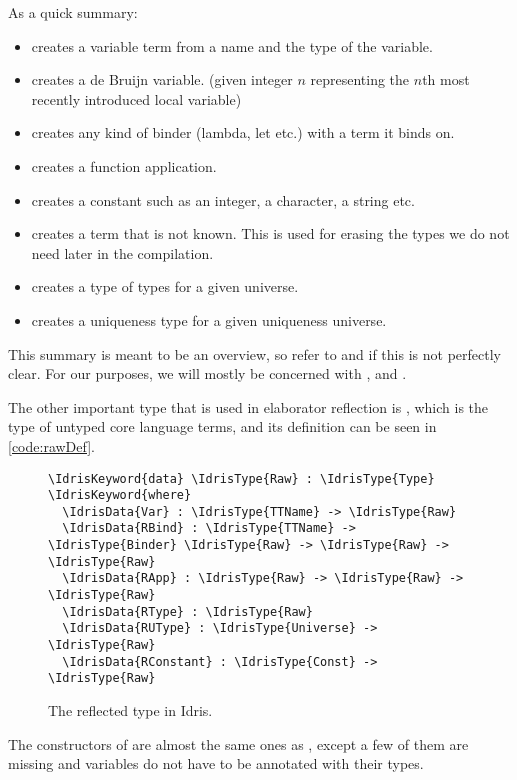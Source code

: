 As a quick summary:
\begin{itemize}
\item{} creates a variable term from a name and the type of the variable.
\item{} creates a de Bruijn variable.
(given integer $n$ representing the $n$th most recently introduced local variable)
\item{} creates any kind of binder (lambda, let etc.) with a term it binds on.
\item{} creates a function application.
\item{} creates a constant such as an integer, a character, a string etc.
\item{} creates a term that is not known. This is used for erasing the types we do not need later in the compilation.
\item{} creates a type of types for a given universe.
\item{} creates a uniqueness type for a given uniqueness universe.
\end{itemize}

This summary is meant to be an overview, so refer to \cite{idris} and
\cite{elabref} if this is not perfectly clear. For our purposes, we will mostly
be concerned with ,  and .

The other important type that is used in elaborator reflection is ,
which is the type of untyped core language terms, and its definition can be
seen in \autoref{code:rawDef}.

\begin{figure}[ht]
\caption{The reflected type \protect{} in Idris.}
\label{code:rawDef}
\begin{Verbatim}[framesep=2mm, label=\footnotesize{\normalfont{Idris}}, labelposition=topline]
\IdrisKeyword{data} \IdrisType{Raw} : \IdrisType{Type} \IdrisKeyword{where}
  \IdrisData{Var} : \IdrisType{TTName} -> \IdrisType{Raw}
  \IdrisData{RBind} : \IdrisType{TTName} -> \IdrisType{Binder} \IdrisType{Raw} -> \IdrisType{Raw} -> \IdrisType{Raw}
  \IdrisData{RApp} : \IdrisType{Raw} -> \IdrisType{Raw} -> \IdrisType{Raw}
  \IdrisData{RType} : \IdrisType{Raw}
  \IdrisData{RUType} : \IdrisType{Universe} -> \IdrisType{Raw}
  \IdrisData{RConstant} : \IdrisType{Const} -> \IdrisType{Raw}
\end{Verbatim}
\end{figure}

The constructors of  are almost the same ones as \TT,
except a few of them are missing and variables do not have to be annotated with
their types.


